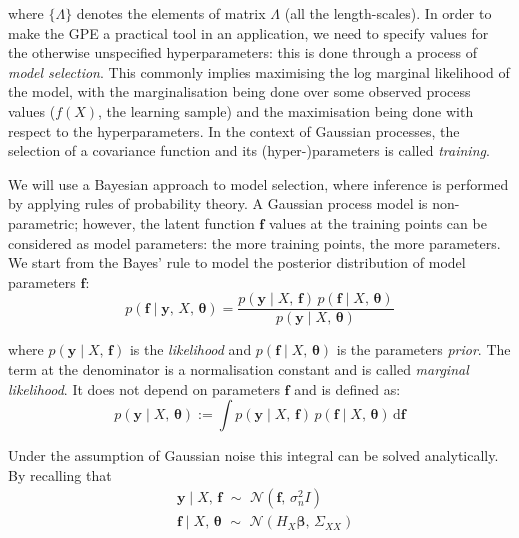 \noindent
where $\{\Lambda\}$ denotes the elements of matrix $\Lambda$ (all the length-scales). In order to make the GPE a practical tool in an application, we need to specify values for the otherwise unspecified hyperparameters: this is done through a process of \textit{model selection}. This commonly implies maximising the log marginal likelihood of the model, with the marginalisation being done over some observed process values ($f(X)$, the learning sample) and the maximisation being done with respect to the hyperparameters. In the context of Gaussian processes, the selection of a covariance function and its (hyper-)parameters is called \textit{training}.

\vspace{0.2cm}
We will use a Bayesian approach to model selection, where inference is performed by applying rules of probability theory. A Gaussian process model is non-parametric; however, the latent function $\mathbf{f}$ values at the training points can be considered as model parameters: the more training points, the more parameters. We start from the Bayes' rule to model the posterior distribution of model parameters $\mathbf{f}$:
%
\begin{equation}
    p(\mathbf{f}\;\vert\; \mathbf{y},\,X,\,\boldsymbol{\theta}) = \frac{p(\mathbf{y}\;\vert\; X,\,\mathbf{f})\,p(\mathbf{f}\;\vert\; X,\,\boldsymbol{\theta})}{p(\mathbf{y}\;\vert\; X,\,\boldsymbol{\theta})}    
\end{equation}

\noindent
where $p(\mathbf{y}\;\vert\; X,\,\mathbf{f})$ is the \textit{likelihood} and $p(\mathbf{f}\;\vert\; X,\,\boldsymbol{\theta})$ is the parameters \textit{prior}. The term at the denominator is a normalisation constant and is called \textit{marginal likelihood}. It does not depend on parameters $\mathbf{f}$ and is defined as:
\begin{equation}
    p(\mathbf{y}\;\vert\; X,\,\boldsymbol{\theta}) := \int p(\mathbf{y}\;\vert\; X,\,\mathbf{f})\,p(\mathbf{f}\;\vert\; X,\,\boldsymbol{\theta})\,\text{d}\mathbf{f}
\end{equation}

\noindent
Under the assumption of Gaussian noise this integral can be solved analytically. By recalling that
\begin{align}
    &\mathbf{y}\;\vert\; X,\,\mathbf{f}\,\,\sim\,\,\mathcal{N}(\mathbf{f},\,\sigma_n^2I) \\
    &\mathbf{f}\;\vert\; X,\,\boldsymbol{\theta} \,\,\sim\,\,\mathcal{N}(H_{X}\boldsymbol{\beta},\,\Sigma_{XX})
\end{align}

